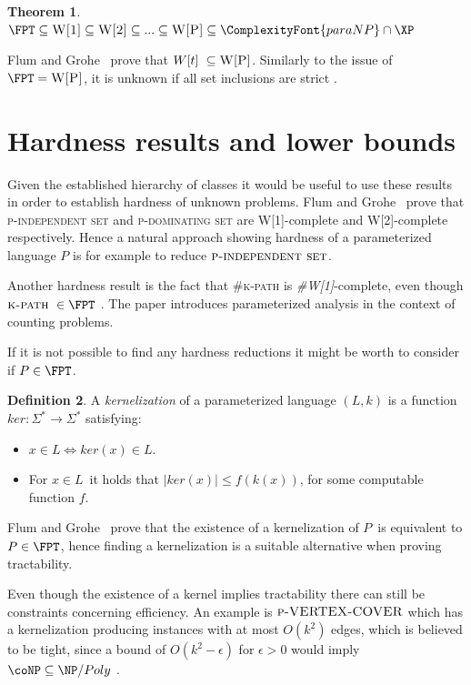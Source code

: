 \documentclass[a4paper,11pt]{report}
\theoremstyle{plain}
\newtheorem{thm}{Theorem}[chapter] %
\theoremstyle{definition}
\newtheorem{defn}[thm]{Definition} %
\newcommand{\PARANP}{\ComplexityFont{paraNP}}
\begin{document}
\begin{thm}
$\FPT \subseteq \textsc{W[1]} \subseteq \textsc{W[2]} \subseteq ...  \subseteq \textsc{W[P]} \subseteq \PARANP \cap \XP$
\end{thm}

Flum and Grohe~\cite{FG06} prove that $W[t] \subseteq \textsc{W[P]}$.
Similarly to the issue of $\FPT = \textsc{W[P]}$, it is unknown if all set inclusions are strict \cite{FG06}.

\section{Hardness results and lower bounds}
Given the established hierarchy of classes it would be useful to use these results in order to establish hardness of unknown problems.
Flum and Grohe~\cite{FG06} prove that \textsc{p-independent set} and \textsc{p-dominating set} are \textsc{W[1]}-complete and \textsc{W[2]}-complete respectively.
Hence a natural approach showing hardness of a parameterized language $P$ is for example to reduce $\textsc{p-independent set}$.

Another hardness result is the fact that \textsc{\#k-path} is \emph{\#W[1]}-complete, even though $\textsc{k-path} \in \FPT$ \cite{FG04}.
The paper introduces parameterized analysis in the context of counting problems.

If it is not possible to find any hardness reductions it might be worth to consider if $P \in \FPT$.

\begin{defn}
A \emph{kernelization} of a parameterized language $(L, k)$ is a function $ker : \Sigma^* \rightarrow \Sigma^*$ satisfying:
\begin{itemize}
\item $x \in L \Leftrightarrow ker(x) \in L$.
\item For $x \in L$ it holds that $|ker(x)| \leq f(k(x))$, for some computable function $f$.
\end{itemize}
\end{defn}

Flum and Grohe~\cite{FG06} prove that the existence of a kernelization of $P$ is equivalent to $P \in \FPT$, hence finding a kernelization is a suitable alternative when proving tractability.

Even though the existence of a kernel implies tractability there can still be constraints concerning efficiency.
An example is $\textsc{p-VERTEX-COVER}$ which has a kernelization producing instances with at most $O(k^2)$ edges, which is believed to be tight, since a bound of $O(k^2 - \epsilon)$ for $\epsilon > 0$
would imply $\coNP \subseteq \NP /Poly$ \cite{DELL10}.
\end{document}
